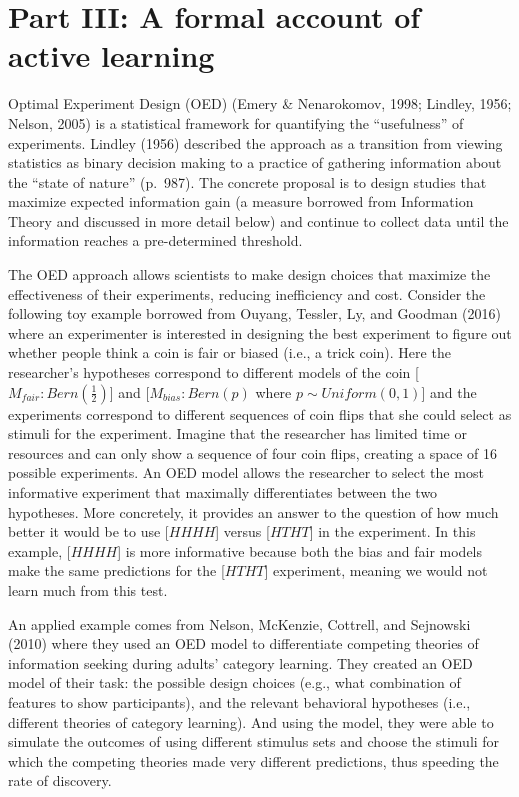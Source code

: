 \documentclass[english,floatsintext,man]{apa6}
\theoremstyle{definition}
\theoremstyle{definition}
\theoremstyle{definition}
\theoremstyle{remark}
\begin{document}
\hypertarget{p3}{\section{Part III: A formal account of active
learning}\label{p3}}

Optimal Experiment Design (OED) (Emery \& Nenarokomov, 1998; Lindley,
1956; Nelson, 2005) is a statistical framework for quantifying the
\enquote{usefulness} of experiments. Lindley (1956) described the
approach as a transition from viewing statistics as binary decision
making to a practice of gathering information about the \enquote{state
of nature} (p.~987). The concrete proposal is to design studies that
maximize expected information gain (a measure borrowed from Information
Theory and discussed in more detail below) and continue to collect data
until the information reaches a pre-determined threshold.

The OED approach allows scientists to make design choices that maximize
the effectiveness of their experiments, reducing inefficiency and cost.
Consider the following toy example borrowed from Ouyang, Tessler, Ly,
and Goodman (2016) where an experimenter is interested in designing the
best experiment to figure out whether people think a coin is fair or
biased (i.e., a trick coin). Here the researcher's hypotheses correspond
to different models of the coin {[}\(M_{fair}: Bern(\frac{1}{2})\){]}
and {[}\(M_{bias}: Bern(p)\) where \(p \sim Uniform(0,1)\){]} and the
experiments correspond to different sequences of coin flips that she
could select as stimuli for the experiment. Imagine that the researcher
has limited time or resources and can only show a sequence of four coin
flips, creating a space of 16 possible experiments. An OED model allows
the researcher to select the most informative experiment that maximally
differentiates between the two hypotheses. More concretely, it provides
an answer to the question of how much better it would be to use
{[}\(HHHH\){]} versus {[}\(HTHT\){]} in the experiment. In this example,
{[}\(HHHH\){]} is more informative because both the bias and fair models
make the same predictions for the {[}\(HTHT\){]} experiment, meaning we
would not learn much from this test.

An applied example comes from Nelson, McKenzie, Cottrell, and Sejnowski
(2010) where they used an OED model to differentiate competing theories
of information seeking during adults' category learning. They created an
OED model of their task: the possible design choices (e.g., what
combination of features to show participants), and the relevant
behavioral hypotheses (i.e., different theories of category learning).
And using the model, they were able to simulate the outcomes of using
different stimulus sets and choose the stimuli for which the competing
theories made very different predictions, thus speeding the rate of
discovery.
\end{document}
